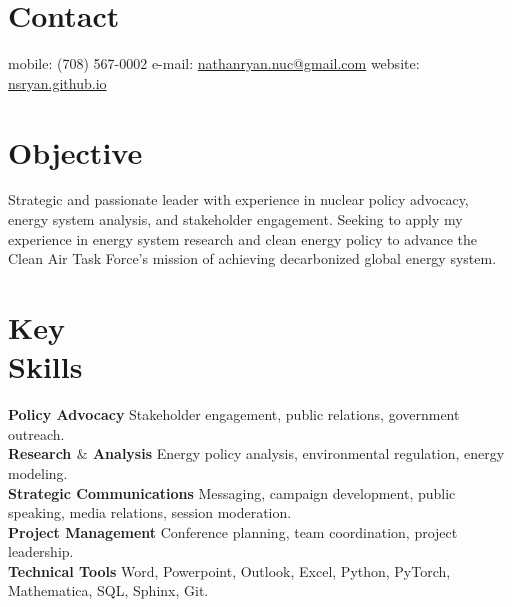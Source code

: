 \documentclass[margin,line]{resume}
\begin{document}
\begin{resume}

%


    \section{\mysidestyle Contact}
    mobile: (708) 567-0002 \hfill e-mail: \href{mailto:nathanryan.nuc@gmail.com}{nathanryan.nuc@gmail.com} \hfill website: \href{https://nsryan.github.io}{nsryan.github.io} \vspace{0mm}\\\vspace{1mm}%

    \vspace{-6mm}
    \section{\mysidestyle Objective}
        Strategic and passionate leader with experience in nuclear policy advocacy, energy system analysis, and stakeholder engagement. Seeking to apply my experience in energy system research and clean energy policy to advance the Clean Air Task Force's mission of achieving decarbonized global energy system.
    \section{\mysidestyle Key\\Skills}
        \textbf{Policy Advocacy} Stakeholder engagement, public relations, government outreach.\vspace{1mm}\\
        \textbf{Research $\&$ Analysis} Energy policy analysis, environmental regulation, energy modeling.\vspace{1mm}\\
        \textbf{Strategic Communications} Messaging, campaign development, public speaking, media relations, session moderation.\vspace{1mm}\\
        \textbf{Project Management} Conference planning, team coordination, project leadership.\vspace{1mm}\\
        \textbf{Technical Tools} Word, Powerpoint, Outlook, Excel, Python, PyTorch, Mathematica, SQL, Sphinx, Git.\vspace{1mm}

\end{resume}
\end{document}

